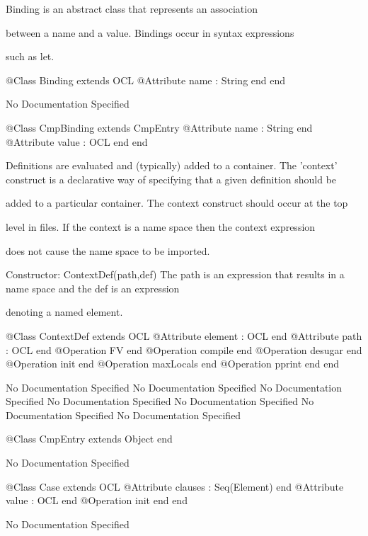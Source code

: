       Binding is an abstract class that represents an association

      between a name and a value. Bindings occur in syntax expressions

      such as let.
\begin{Interface}
@Class Binding extends OCL
  @Attribute name : String end
end
\end{Interface}
No Documentation Specified
\begin{Interface}
@Class CmpBinding extends CmpEntry
  @Attribute name : String end
  @Attribute value : OCL end
end
\end{Interface}

      Definitions are evaluated and (typically) added to a container. The 'context'
      construct is a declarative way of specifying that a given definition should be

      added to a particular container. The context construct should occur at the top

      level in files. If the context is a name space then the context expression

      does not cause the name space to be imported.
      
      Constructor: ContextDef(path,def)
        The path is an expression that results in a name space and the def is an expression

        denoting a named element.
\begin{Interface}
@Class ContextDef extends OCL
  @Attribute element : OCL end
  @Attribute path : OCL end
  @Operation FV end
  @Operation compile end
  @Operation desugar end
  @Operation init end
  @Operation maxLocals end
  @Operation pprint end
end
\end{Interface}
No Documentation Specified
No Documentation Specified
No Documentation Specified
No Documentation Specified
No Documentation Specified
No Documentation Specified
No Documentation Specified
\begin{Interface}
@Class CmpEntry extends Object
end
\end{Interface}
No Documentation Specified
\begin{Interface}
@Class Case extends OCL
  @Attribute clauses : Seq(Element) end
  @Attribute value : OCL end
  @Operation init end
end
\end{Interface}
No Documentation Specified

